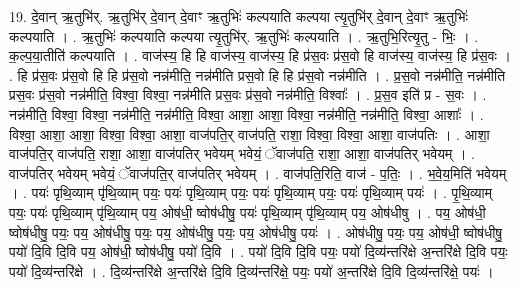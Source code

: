 \documentclass[17pt]{extarticle}
\begin{document}
19. दे॒वान् ऋ॒तुभि॑र्. ऋ॒तुभि॑र् दे॒वान् दे॒वाꣳ ऋ॒तुभिः॑ कल्पयाति कल्पया त्यृ॒तुभि॑र् दे॒वान् दे॒वाꣳ ऋ॒तुभिः॑ कल्पयाति । . ऋ॒तुभिः॑ कल्पयाति कल्पया त्यृ॒तुभि॑र्. ऋ॒तुभिः॑ कल्पयाति । . ऋ॒तुभि॒रित्यृ॒तु - भिः॒ । . क॒ल्प॒या॒तीति॑ कल्पयाति । . वाज॑स्य॒ हि हि वाज॑स्य॒ वाज॑स्य॒ हि प्र॑स॒वः प्र॑स॒वो हि वाज॑स्य॒ वाज॑स्य॒ हि प्र॑स॒वः । . हि प्र॑स॒वः प्र॑स॒वो हि हि प्र॑स॒वो नन्न॑मीति॒ नन्न॑मीति प्रस॒वो हि हि प्र॑स॒वो नन्न॑मीति । . प्र॒स॒वो नन्न॑मीति॒ नन्न॑मीति प्रस॒वः प्र॑स॒वो नन्न॑मीति॒ विश्वा॒ विश्वा॒ नन्न॑मीति प्रस॒वः प्र॑स॒वो नन्न॑मीति॒ विश्वाः᳚ । . प्र॒स॒व इति॑ प्र - स॒वः । . नन्न॑मीति॒ विश्वा॒ विश्वा॒ नन्न॑मीति॒ नन्न॑मीति॒ विश्वा॒ आशा॒ आशा॒ विश्वा॒ नन्न॑मीति॒ नन्न॑मीति॒ विश्वा॒ आशाः᳚ । . विश्वा॒ आशा॒ आशा॒ विश्वा॒ विश्वा॒ आशा॒ वाज॑पति॒र् वाज॑पति॒ राशा॒ विश्वा॒ विश्वा॒ आशा॒ वाज॑पतिः । . आशा॒ वाज॑पति॒र् वाज॑पति॒ राशा॒ आशा॒ वाज॑पतिर् भवेयम् भवेयं॒ ॅवाज॑पति॒ राशा॒ आशा॒ वाज॑पतिर् भवेयम् । . वाज॑पतिर् भवेयम् भवेयं॒ ॅवाज॑पति॒र् वाज॑पतिर् भवेयम् । . वाज॑पति॒रिति॒ वाज॑ - प॒तिः॒ । . भ॒वे॒य॒मिति॑ भवेयम् । . पयः॑ पृथि॒व्याम् पृ॑थि॒व्याम् पयः॒ पयः॑ पृथि॒व्याम् पयः॒ पयः॑ पृथि॒व्याम् पयः॒ पयः॑ पृथि॒व्याम् पयः॑ । . पृ॒थि॒व्याम् पयः॒ पयः॑ पृथि॒व्याम् पृ॑थि॒व्याम् पय॒ ओष॑धी॒ ष्वोष॑धीषु॒ पयः॑ पृथि॒व्याम् पृ॑थि॒व्याम् पय॒ ओष॑धीषु । . पय॒ ओष॑धी॒ ष्वोष॑धीषु॒ पयः॒ पय॒ ओष॑धीषु॒ पयः॒ पय॒ ओष॑धीषु॒ पयः॒ पय॒ ओष॑धीषु॒ पयः॑ । . ओष॑धीषु॒ पयः॒ पय॒ ओष॑धी॒ ष्वोष॑धीषु॒ पयो॑ दि॒वि दि॒वि पय॒ ओष॑धी॒ ष्वोष॑धीषु॒ पयो॑ दि॒वि । . पयो॑ दि॒वि दि॒वि पयः॒ पयो॑ दि॒व्य॑न्तरि॑क्षे अ॒न्तरि॑क्षे दि॒वि पयः॒ पयो॑ दि॒व्य॑न्तरि॑क्षे । . दि॒व्य॑न्तरि॑क्षे अ॒न्तरि॑क्षे दि॒वि दि॒व्य॑न्तरि॑क्षे॒ पयः॒ पयो॑ अ॒न्तरि॑क्षे दि॒वि दि॒व्य॑न्तरि॑क्षे॒ पयः॑ । \newline
\end{document}

